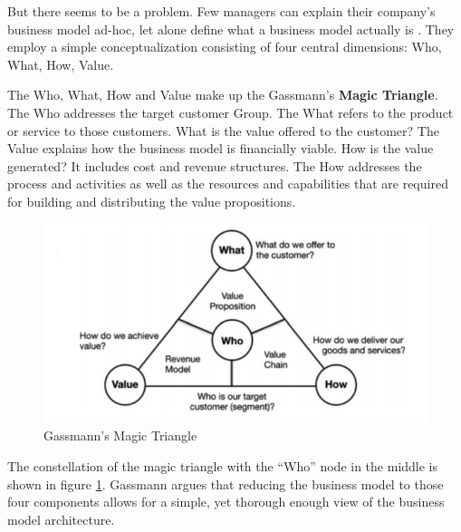 		But there seems to be a problem. Few managers can explain their company's business model ad-hoc, let alone define what a business model actually is \cite{gassmann}. They employ a simple conceptualization consisting of four central dimensions: Who, What, How, Value. 

		The Who, What, How and Value make up the Gassmann's \textbf{Magic Triangle}. The Who addresses the target customer Group. The What refers to the product or service to those customers. What is the value offered to the customer? The Value explains how the business model is financially viable. How is the value generated? It includes cost and revenue structures. The How addresses the process and activities as well as the resources and capabilities that are required for building and distributing the value propositions.		
					
		\begin{figure}[ht]
		    \begin{center}
		    \includegraphics[scale=0.6]{Talk11/Figure1.png}
		    \end{center}
		    \caption{Gassmann's Magic Triangle}
		    \label{fig:m_triangle}
		\end{figure}
		The constellation of the magic triangle with the ``Who'' node in the middle is shown in figure \ref{fig:m_triangle}.
		Gassmann argues that reducing the business model to those four components allows for a simple, yet thorough enough view of the business model architecture.

